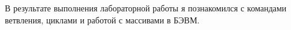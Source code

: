 В результате выполнения лабораторной работы я познакомился с командами ветвления, циклами и работой с массивами в БЭВМ.